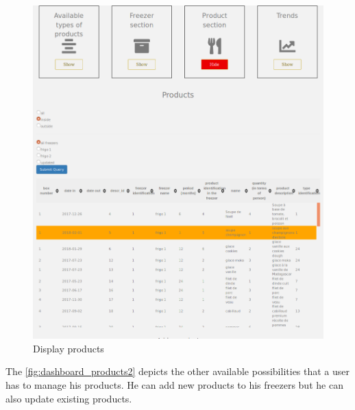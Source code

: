 \begin{figure}[H]
\centering
\includegraphics[scale=0.4]{./images/dashboard_products1.png}
\caption{Display products}
\label{fig:dashboard_products1}
\end{figure}

The \autoref{fig:dashboard_products2} depicts the other available possibilities that a user has to manage his products. He can add new products to his freezers but he can also update existing products.

